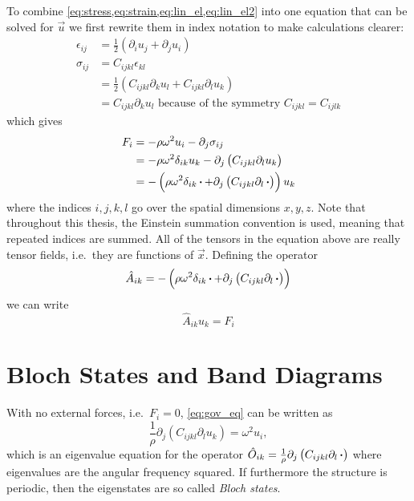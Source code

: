 To combine \cref{eq:stress,eq:strain,eq:lin_el,eq:lin_el2} into one equation that can be solved for $\vec{u}$ we first
rewrite them in index notation to make calculations clearer:
\begin{align}
	\epsilon_{ij} &= \frac12(\partial_i u_j + \partial_j u_i)\\
	\label{eq:double_scalar_product_index_not}
	\sigma_{ij} &= C_{ijkl} \epsilon_{kl}\\
				&= \frac12\left(C_{ijkl} \partial_k u_l + C_{ijkl} \partial_l
				u_k\right)\\
				&= C_{ijkl} \partial_k u_l\text{ because of the symmetry
				$C_{ijkl}=C_{ijlk}$}
\end{align}
which gives
\begin{align}
	F_{i} &= -\rho \omega^2 u_{i} - \partial_j \sigma_{ij}\\
		   &= -\rho \omega^2 \delta_{ik} u_{k} -
		   \partial_j \left(C_{ijkl} \partial_l u_k\right)\\
		   &= -\left(\rho \omega^2 \delta_{ik} \operatorname{\boldsymbol{\cdot}} + 
		   \partial_j \left(C_{ijkl} \partial_l \operatorname{\boldsymbol{\cdot}}\right)\right) u_k
\end{align}
where the indices $i,j,k,l$ go over the spatial dimensions $x,y,z$.
Note that throughout this thesis, the Einstein summation convention is used,
meaning that repeated indices are summed.
All of the tensors in the equation above are really tensor fields, i.e.\ they are
functions of $\vec{x}$.
Defining the operator
\begin{equation}\label{eq:A_def}
	\hat A_{ik} =
	-\left(\rho \omega^2 \delta_{ik} \operatorname{\boldsymbol{\cdot}} +
	\partial_j \left(C_{ijkl} \partial_l \operatorname{\boldsymbol{\cdot}}\right)\right)
\end{equation}
we can write
\begin{equation}\label{eq:gov_eq}
	\hat A_{ik} u_k = F_i
\end{equation}

\section{Bloch States and Band Diagrams}\label{sec:bloch}

With no external forces, i.e.\ $F_i = 0$, \cref{eq:gov_eq} can be written as
\begin{equation}
	\frac 1 \rho \partial_j \left(C_{ijkl} \partial_l u_k\right) = \omega^2 u_i,
\end{equation}
which is an eigenvalue equation for the operator
$\hat O_{ik} = \frac 1 \rho\partial_j \left(C_{ijkl} \partial_l \operatorname{\boldsymbol{\cdot}}\right)$
where eigenvalues are the angular frequency squared.
If furthermore the structure is periodic, then the eigenstates are so called
\emph{Bloch states}.

